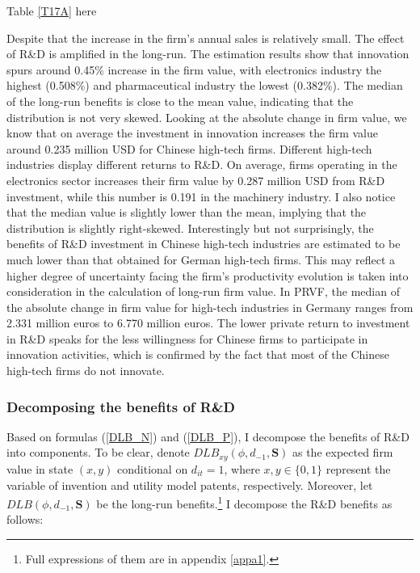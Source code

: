\documentclass[English]{article}
\begin{document}
\begin{center}
Table \ref{T17A} here
\end{center}

Despite that the increase in the firm's annual sales is relatively small. The effect of R\&D is amplified in the long-run.  The estimation results show that innovation spurs around 0.45\% increase in the firm value, with electronics industry the highest (0.508\%) and pharmaceutical industry the lowest (0.382\%). The median of the long-run benefits is close to the mean value, indicating that the distribution is not very skewed. Looking at the absolute change in firm value, we know that on average the investment in innovation increases the firm value around 0.235 million USD for Chinese high-tech firms. Different high-tech industries display different returns to R\&D. On average, firms operating in the electronics sector increases their firm value by 0.287 million USD from R\&D investment, while this number is 0.191 in the machinery industry. I also notice that the median value is slightly lower than the mean, implying that the distribution is slightly right-skewed. Interestingly but not surprisingly, the benefits of R\&D investment in Chinese high-tech industries are estimated to be much lower than that obtained for German high-tech firms. This may reflect a higher degree of uncertainty facing the firm's productivity evolution is taken into consideration in the calculation of long-run firm value. In PRVF, the median of the absolute change in firm value for high-tech industries in Germany ranges from 2.331 million euros to 6.770 million euros. The lower private return to investment in R\&D speaks for the less willingness for Chinese firms to participate in innovation activities, which is confirmed by the fact that most of the Chinese high-tech firms do not innovate. 

\subsubsection{Decomposing the benefits of R\&D} 
Based on formulas (\ref{DLB_N}) and (\ref{DLB_P}), I decompose the benefits of R\&D into components. To be clear, denote $DLB_{xy}(\phi, d_{-1},\mathbf{S})$ as the expected firm value in state $(x,y)$ conditional on $d_{it}=1$, where $x, y\in\{0,1\}$ represent the variable of invention and utility model patents, respectively. Moreover, let $DLB(\phi, d_{-1},\mathbf{S})$ be the long-run benefits.\footnote{Full expressions of them are in appendix \ref{appa1}.} I decompose the R\&D benefits as follows:
\end{document}
